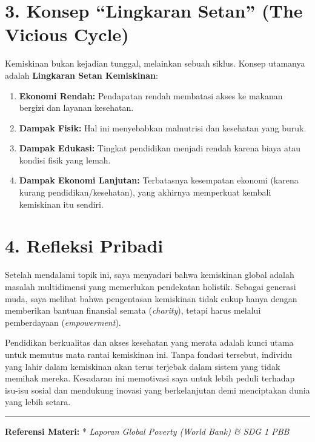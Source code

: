 \documentclass[
  letterpaper,
  DIV=11,
  numbers=noendperiod]{scrreprt}
\providecommand{\tightlist}{%
  \setlength{\itemsep}{0pt}\setlength{\parskip}{0pt}}
\begin{document}
\section{3. Konsep ``Lingkaran Setan'' (The Vicious
Cycle)}\label{konsep-lingkaran-setan-the-vicious-cycle}

Kemiskinan bukan kejadian tunggal, melainkan sebuah siklus. Konsep
utamanya adalah \textbf{Lingkaran Setan Kemiskinan}:

\begin{enumerate}
\def\labelenumi{\arabic{enumi}.}
\tightlist
\item
  \textbf{Ekonomi Rendah:} Pendapatan rendah membatasi akses ke makanan
  bergizi dan layanan kesehatan.
\item
  \textbf{Dampak Fisik:} Hal ini menyebabkan malnutrisi dan kesehatan
  yang buruk.
\item
  \textbf{Dampak Edukasi:} Tingkat pendidikan menjadi rendah karena
  biaya atau kondisi fisik yang lemah.
\item
  \textbf{Dampak Ekonomi Lanjutan:} Terbatasnya kesempatan ekonomi
  (karena kurang pendidikan/kesehatan), yang akhirnya memperkuat kembali
  kemiskinan itu sendiri.
\end{enumerate}

\section{4. Refleksi Pribadi}\label{refleksi-pribadi}

Setelah mendalami topik ini, saya menyadari bahwa kemiskinan global
adalah masalah multidimensi yang memerlukan pendekatan holistik. Sebagai
generasi muda, saya melihat bahwa pengentasan kemiskinan tidak cukup
hanya dengan memberikan bantuan finansial semata (\emph{charity}),
tetapi harus melalui pemberdayaan (\emph{empowerment}).

Pendidikan berkualitas dan akses kesehatan yang merata adalah kunci
utama untuk memutus mata rantai kemiskinan ini. Tanpa fondasi tersebut,
individu yang lahir dalam kemiskinan akan terus terjebak dalam sistem
yang tidak memihak mereka. Kesadaran ini memotivasi saya untuk lebih
peduli terhadap isu-isu sosial dan mendukung inovasi yang berkelanjutan
demi menciptakan dunia yang lebih setara.

\begin{center}\rule{0.5\linewidth}{0.5pt}\end{center}

\textbf{Referensi Materi:} * \emph{Laporan Global Poverty (World Bank)
\& SDG 1 PBB}
\end{document}
